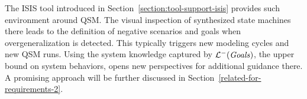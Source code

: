 \begin{itemize}
The ISIS tool introduced in Section~\ref{section:tool-support-isis} provides such environment around QSM. The visual inspection of synthesized state machines there leads to the definition of negative scenarios and goals when overgeneralization is detected. This typically triggers new modeling cycles and new QSM runs. Using the system knowledge captured by $\mathcal{L}^-(\mbox{\emph{Goals}})$, the upper bound on system behaviors, opens new perspectives for additional guidance there. A promising approach will be further discussed in Section~\ref{related-for-requirements-2}.
\end{itemize}
